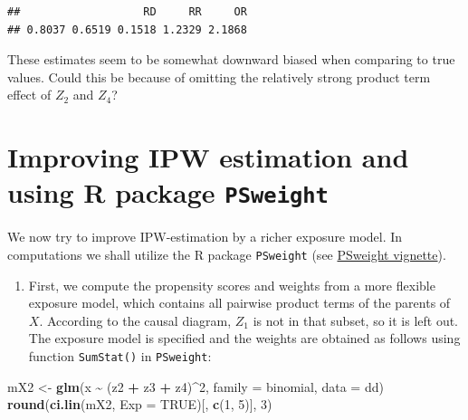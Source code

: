 \documentclass[
]{book}
\newenvironment{Shaded}{\begin{snugshade}}{\end{snugshade}}
\newcommand{\AttributeTok}[1]{\textcolor[rgb]{0.13,0.29,0.53}{#1}}
\newcommand{\ConstantTok}[1]{\textcolor[rgb]{0.56,0.35,0.01}{#1}}
\newcommand{\DecValTok}[1]{\textcolor[rgb]{0.00,0.00,0.81}{#1}}
\newcommand{\FunctionTok}[1]{\textcolor[rgb]{0.13,0.29,0.53}{\textbf{#1}}}
\newcommand{\NormalTok}[1]{#1}
\newcommand{\OtherTok}[1]{\textcolor[rgb]{0.56,0.35,0.01}{#1}}
\newcommand{\SpecialCharTok}[1]{\textcolor[rgb]{0.81,0.36,0.00}{\textbf{#1}}}
\providecommand{\tightlist}{%
  \setlength{\itemsep}{0pt}\setlength{\parskip}{0pt}}
\begin{document}
\begin{verbatim}
##                   RD     RR     OR 
## 0.8037 0.6519 0.1518 1.2329 2.1868
\end{verbatim}

These estimates seem to be somewhat downward biased when
comparing to
true values. Could this be because of omitting
the relatively strong
product term effect of \(Z_2\) and \(Z_4\)?

\section{\texorpdfstring{Improving IPW estimation and using R package \texttt{PSweight}}{Improving IPW estimation and using R package PSweight}}\label{improving-ipw-estimation-and-using-r-package-psweight}

We now try to improve IPW-estimation by a richer exposure
model. In
computations we shall utilize the R package
\texttt{PSweight} (see \href{https://cran.r-project.org/web/packages/PSweight/vignettes/vignette.pdf}{PSweight
vignette}).

\begin{enumerate}
\def\labelenumi{\arabic{enumi}.}
\tightlist
\item
  First, we compute the propensity scores
  and weights from a more flexible exposure model,
  which contains all pairwise product terms
  of the parents of \(X\).
  According to the causal diagram, \(Z_1\) is
  not in that subset, so it
  is left out. The exposure model is
  specified and the weights are
  obtained as follows using function
  \texttt{SumStat()} in \texttt{PSweight}:
\end{enumerate}

\begin{Shaded}
\begin{Highlighting}[]
\NormalTok{mX2 }\OtherTok{\textless{}{-}} \FunctionTok{glm}\NormalTok{(x }\SpecialCharTok{\textasciitilde{}}\NormalTok{ (z2 }\SpecialCharTok{+}\NormalTok{ z3 }\SpecialCharTok{+}\NormalTok{ z4)}\SpecialCharTok{\^{}}\DecValTok{2}\NormalTok{, }\AttributeTok{family =}\NormalTok{ binomial, }\AttributeTok{data =}\NormalTok{ dd)}
\FunctionTok{round}\NormalTok{(}\FunctionTok{ci.lin}\NormalTok{(mX2, }\AttributeTok{Exp =} \ConstantTok{TRUE}\NormalTok{)[, }\FunctionTok{c}\NormalTok{(}\DecValTok{1}\NormalTok{, }\DecValTok{5}\NormalTok{)], }\DecValTok{3}\NormalTok{)}
\end{Highlighting}
\end{Shaded}
\end{document}
